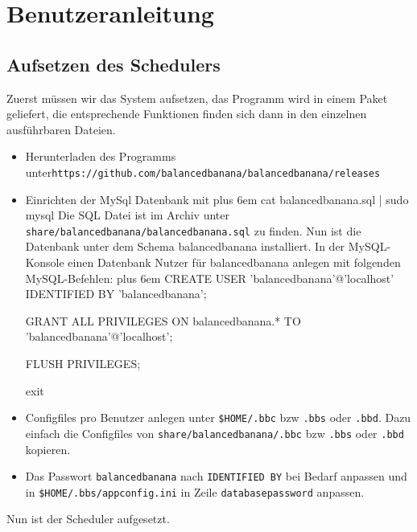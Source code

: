 \documentclass[a4paper,12pt]{article}
\makeatletter
\newenvironment{mycode}
 {\def\@xobeysp{\ }\verbatim\rightskip=0pt plus 6em\relax}
 {\endverbatim}
\makeatother
\begin{document}
\section{Benutzeranleitung}
\subsection{Aufsetzen des Schedulers}
\vspace{0.2cm}
Zuerst müssen wir das System aufsetzen, das Programm wird in einem Paket geliefert, die entsprechende Funktionen finden sich dann in den einzelnen ausführbaren Dateien.
\begin{itemize}[label={\textbullet}]
    \item Herunterladen des Programms unter\newline \texttt{https://github.com/balancedbanana/balancedbanana/releases}
    \item Einrichten der MySql Datenbank mit \newline
    \begin{mycode}
    cat balancedbanana.sql | sudo mysql
    \end{mycode}
    Die SQL Datei ist im Archiv unter \newline \texttt{share/balancedbanana/balancedbanana.sql} \newline
    zu finden.\newline
    Nun ist die Datenbank unter dem Schema balancedbanana installiert.
    In der MySQL-Konsole einen Datenbank Nutzer für balancedbanana anlegen mit folgenden MySQL-Befehlen:
    \begin{mycode}
    CREATE USER 'balancedbanana'@'localhost' IDENTIFIED BY 
    'balancedbanana';
    	
    GRANT ALL PRIVILEGES ON balancedbanana.* TO 'balancedbanana'@'localhost';
        
    FLUSH PRIVILEGES;
        
    exit
    \end{mycode}
    \item Configfiles pro Benutzer anlegen unter \newline
    \texttt{\$HOME/.bbc} bzw \texttt{.bbs} oder \texttt{.bbd}. \newline
    Dazu einfach die Configfiles von \newline
    \texttt{share/balancedbanana/.bbc} bzw \texttt{.bbs} oder \texttt{.bbd} \newline
    kopieren.
    \item  Das Passwort \texttt{balancedbanana} nach \texttt{IDENTIFIED BY} bei Bedarf anpassen und in \newline
    \texttt{\$HOME/.bbs/appconfig.ini} \newline
    in Zeile \texttt{databasepassword} anpassen. \newline

\end{itemize}
Nun ist der Scheduler aufgesetzt.
\end{document}
